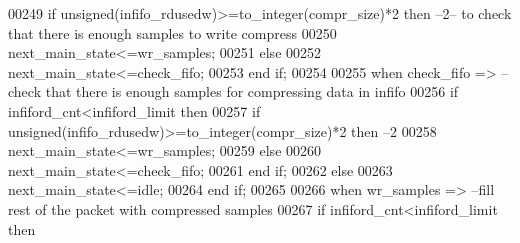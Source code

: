 \begin{DoxyCode}
00249             \textcolor{keywordflow}{if} \textcolor{comment}{unsigned}\textcolor{vhdlchar}{(}\textcolor{vhdlchar}{infifo_rdusedw}\textcolor{vhdlchar}{)}\textcolor{vhdlchar}{>=}\textcolor{vhdlchar}{to\_integer}\textcolor{vhdlchar}{(}\textcolor{vhdlchar}{compr_size}\textcolor{vhdlchar}{)}\textcolor{vhdlchar}{*}\textcolor{vhdllogic}{}\textcolor{vhdllogic}{2}  \textcolor{keywordflow}{then}\textcolor{keyword}{ --2-- to check that there is enough
       samples to write compress }
00250                 \textcolor{vhdlchar}{next_main_state}\textcolor{vhdlchar}{<=}\textcolor{vhdlchar}{wr\_samples};
00251             \textcolor{keywordflow}{else} 
00252                 \textcolor{vhdlchar}{next_main_state}\textcolor{vhdlchar}{<=}\textcolor{vhdlchar}{check\_fifo};
00253             \textcolor{keywordflow}{end} \textcolor{keywordflow}{if};
00254           
00255         \textcolor{keywordflow}{when} \textcolor{vhdlchar}{check\_fifo} \textcolor{vhdlchar}{=}\textcolor{vhdlchar}{>}\textcolor{keyword}{   --check that there is enough samples for compressing data in infifo}
00256             \textcolor{keywordflow}{if} \textcolor{vhdlchar}{infiford_cnt}\textcolor{vhdlchar}{<}\textcolor{vhdlchar}{infiford_limit} \textcolor{keywordflow}{then}  
00257                 \textcolor{keywordflow}{if} \textcolor{comment}{unsigned}\textcolor{vhdlchar}{(}\textcolor{vhdlchar}{infifo_rdusedw}\textcolor{vhdlchar}{)}\textcolor{vhdlchar}{>=}\textcolor{vhdlchar}{to\_integer}\textcolor{vhdlchar}{(}\textcolor{vhdlchar}{compr_size}\textcolor{vhdlchar}{)}\textcolor{vhdlchar}{*}\textcolor{vhdllogic}{}\textcolor{vhdllogic}{2} \textcolor{keywordflow}{then}\textcolor{keyword}{ --2}
00258                     \textcolor{vhdlchar}{next_main_state}\textcolor{vhdlchar}{<=}\textcolor{vhdlchar}{wr\_samples};
00259                 \textcolor{keywordflow}{else} 
00260                     \textcolor{vhdlchar}{next_main_state}\textcolor{vhdlchar}{<=}\textcolor{vhdlchar}{check\_fifo};
00261                 \textcolor{keywordflow}{end} \textcolor{keywordflow}{if};
00262             \textcolor{keywordflow}{else} 
00263                 \textcolor{vhdlchar}{next_main_state}\textcolor{vhdlchar}{<=}\textcolor{vhdlchar}{idle};
00264             \textcolor{keywordflow}{end} \textcolor{keywordflow}{if};
00265           
00266         \textcolor{keywordflow}{when} \textcolor{vhdlchar}{wr\_samples} \textcolor{vhdlchar}{=}\textcolor{vhdlchar}{>}\textcolor{keyword}{  --fill rest of the packet with compressed samples}
00267             \textcolor{keywordflow}{if}  \textcolor{vhdlchar}{infiford_cnt}\textcolor{vhdlchar}{<}\textcolor{vhdlchar}{infiford_limit} \textcolor{keywordflow}{then} 

\end{DoxyCode}
